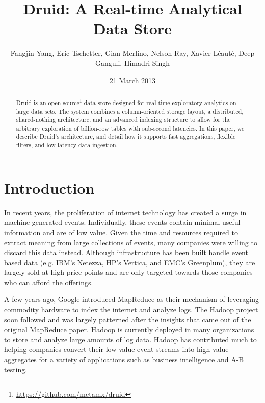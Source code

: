\documentclass{acm_proc_article-sp}
\begin{document}

\title{Druid: A Real-time Analytical Data Store}


\author{
\alignauthor Fangjin Yang, Eric Tschetter, Gian Merlino, Nelson Ray, Xavier Léauté, Deep Ganguli, Himadri Singh\\
}
\date{21 March 2013}

\maketitle

\begin{abstract} 
Druid is an open
source\footnote{\href{https://github.com/metamx/druid}{https://github.com/metamx/druid}}
data store designed for real-time exploratory analytics on large data sets.
The system combines a column-oriented storage layout, a distributed,
shared-nothing architecture, and an advanced indexing structure to allow for
the arbitrary exploration of billion-row tables with sub-second latencies. In
this paper, we describe Druid's architecture, and detail how it supports fast
aggregations, flexible filters, and low latency data ingestion.  
\end{abstract}

\section{Introduction} 
In recent years, the proliferation of internet technology has
created a surge in machine-generated events.  Individually, these
events contain minimal useful information and are of low value.  Given the
time and resources required to extract meaning from large collections of
events, many companies were willing to discard this data instead.  Although
infrastructure has been built handle event based data (e.g. IBM's
Netezza\cite{singh2011introduction}, HP's Vertica\cite{bear2012vertica}, and EMC's
Greenplum\cite{miner2012unified}), they are largely sold at high price points
and are only targeted towards those companies who can afford the offerings.

A few years ago, Google introduced MapReduce \cite{dean2008mapreduce} as their
mechanism of leveraging commodity hardware to index the internet and analyze
logs.  The Hadoop \cite{shvachko2010hadoop} project soon followed and was
largely patterned after the insights that came out of the original MapReduce
paper. Hadoop is currently deployed in many organizations to store and analyze
large amounts of log data.  Hadoop has contributed much to helping companies
convert their low-value event streams into high-value aggregates for a variety
of applications such as business intelligence and A-B testing.
\end{document}
